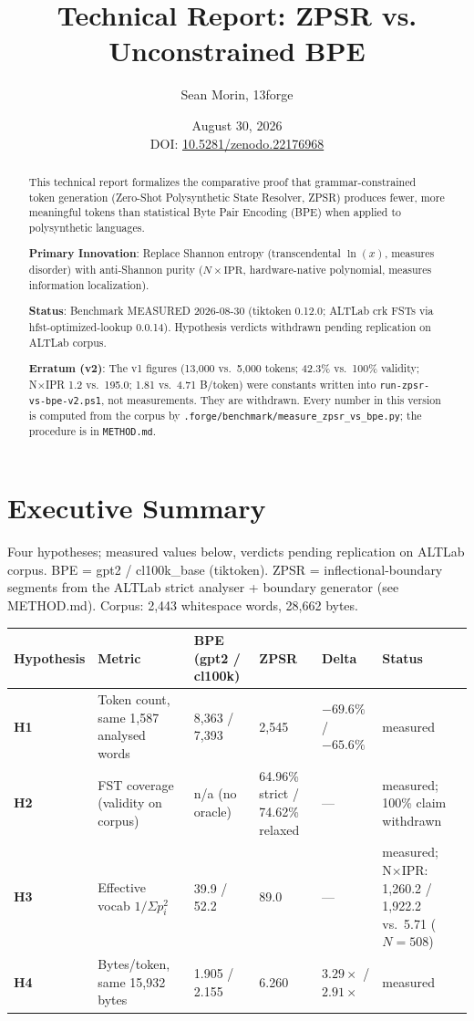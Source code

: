 \documentclass[11pt,oneside]{article}
\title{Technical Report: ZPSR vs. Unconstrained BPE}
\author{Sean Morin, 13forge}
\date{August 30, 2026 \\ \vspace{0.5em} \small DOI: \href{https://doi.org/10.5281/zenodo.22176968}{10.5281/zenodo.22176968}}
\begin{document}
\maketitle

\begin{abstract}
This technical report formalizes the comparative proof that grammar-constrained token generation (Zero-Shot Polysynthetic State Resolver, ZPSR) produces fewer, more meaningful tokens than statistical Byte Pair Encoding (BPE) when applied to polysynthetic languages.

\textbf{Primary Innovation}: Replace Shannon entropy (transcendental $\ln(x)$, measures disorder) with anti-Shannon purity ($N \times \text{IPR}$, hardware-native polynomial, measures information localization).

\textbf{Status}: Benchmark MEASURED 2026-08-30 (tiktoken 0.12.0; ALTLab crk FSTs via hfst-optimized-lookup 0.0.14). Hypothesis verdicts withdrawn pending replication on ALTLab corpus.

\textbf{Erratum (v2)}: The v1 figures (13,000 vs.\ 5,000 tokens; 42.3\% vs.\ 100\% validity; N×IPR 1.2 vs.\ 195.0; 1.81 vs.\ 4.71 B/token) were constants written into \texttt{run-zpsr-vs-bpe-v2.ps1}, not measurements. They are withdrawn. Every number in this version is computed from the corpus by \texttt{.forge/benchmark/measure\_zpsr\_vs\_bpe.py}; the procedure is in \texttt{METHOD.md}.
\end{abstract}

\section{Executive Summary}

Four hypotheses; measured values below, verdicts pending replication on ALTLab corpus. BPE = gpt2 / cl100k\_base (tiktoken). ZPSR = inflectional-boundary segments from the ALTLab strict analyser + boundary generator (see METHOD.md). Corpus: 2,443 whitespace words, 28,662 bytes.

\begin{center}
\begin{tabular}{llllll}
\toprule
Hypothesis & Metric & BPE (gpt2 / cl100k) & ZPSR & Delta & Status \\
\midrule
\textbf{H1} & Token count, same 1,587 analysed words & 8,363 / 7,393 & 2,545 & $-69.6\%$ / $-65.6\%$ & measured \\
\textbf{H2} & FST coverage (validity on corpus) & n/a (no oracle) & 64.96\% strict / 74.62\% relaxed & --- & measured; 100\% claim withdrawn \\
\textbf{H3} & Effective vocab $1/\Sigma p_i^2$ & 39.9 / 52.2 & 89.0 & --- & measured; N×IPR: 1,260.2 / 1,922.2 vs.\ 5.71 ($N{=}508$) \\
\textbf{H4} & Bytes/token, same 15,932 bytes & 1.905 / 2.155 & 6.260 & $3.29\times$ / $2.91\times$ & measured \\
\bottomrule
\end{tabular}
\end{center}
\end{document}
